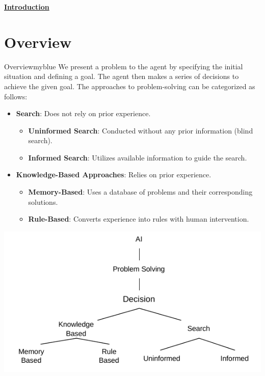 \newpage
\null
\vspace{0.15cm}

\begin{center}
    \Huge{\textbf{\underline{Introduction}}}
\end{center}

\setcounter{section}{0}

\vspace{0.35cm}

\section{Overview}
\begin{prettyBox}{Overview}{myblue}
We present a problem to the agent by specifying the initial situation and defining a goal. The agent then makes a series of decisions to achieve the given goal. The approaches to problem-solving can be categorized as follows: 
\begin{itemize}
    \item \textbf{Search}: Does not rely on prior experience. 
        \begin{itemize}
            \item \textbf{Uninformed Search}: Conducted without any prior information (blind search).
            \item \textbf{Informed Search}: Utilizes available information to guide the search.
        \end{itemize}
    \item \textbf{Knowledge-Based Approaches}: Relies on prior experience. 
        \begin{itemize}
            \item \textbf{Memory-Based}: Uses a database of problems and their corresponding solutions.
            \item \textbf{Rule-Based}: Converts experience into rules with human intervention.
        \end{itemize}
    \end{itemize}
\end{prettyBox}

\vspace{0.35cm}

\begin{center}
    \includegraphics[height=0.4\textheight]{Chapters/Diagram/overview.drawio.pdf}
\end{center}




